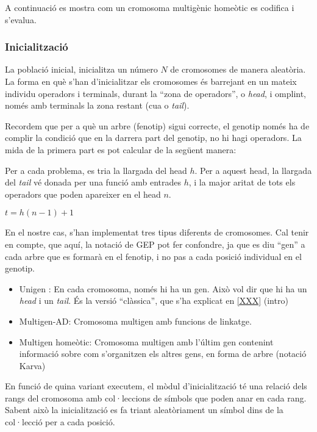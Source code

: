\documentclass[titlepage,a4paper,12pt]{book}
\begin{document}
A continuació es mostra com un cromosoma multigènic homeòtic es codifica i
s'evalua.


\subsubsection{Inicialització} %
\label{ssub:Inicialitzacio}
La població inicial, inicialitza un número $N$ de cromosomes de manera
aleatòria.  La forma en què s'han d'inicialitzar els cromosomes és barrejant en
un mateix individu operadors i terminals, durant la ``zona de operadors'', o
\emph{head}, i omplint, només amb terminals la zona restant (cua o \emph{tail}).

Recordem que per a què un arbre (fenotip) sigui correcte, el genotip només ha de
complir la condició que en la darrera part del genotip, no hi hagi operadors.
La mida de la primera part es pot calcular de la següent manera:

Per a cada problema, es tria la llargada del head $h$.  Per a aquest head, la
llargada del \emph{tail} vé donada per una funció amb entrades $h$, i la major
aritat de tots els operadors que poden apareixer en el head $n$.

\begin{math}
t =  h (n-1) + 1
\end{math}

En el nostre cas, s'han implementat tres tipus diferents de cromosomes. Cal
tenir en compte, que aquí, la notació de GEP pot fer confondre, ja que es diu
``gen'' a cada arbre que es formarà en el fenotip, i no pas a cada posició
individual en el genotip.

\begin{itemize}
	\item Unigen : En cada cromosoma, només hi ha un gen.  Això vol dir que hi
	ha un \emph{head} i un \emph{tail}. És la versió ``clàssica'', que s'ha
	explicat en \ref{XXX} (intro)
	\item Multigen-AD: Cromosoma multigen amb funcions de linkatge.
	\item Multigen homeòtic: Cromosoma multigen amb l'últim gen contenint
	informació sobre com s'organitzen els altres gens, en forma de arbre
	(notació Karva)
\end{itemize}

En funció de quina variant executem, el mòdul  d'inicialització té una relació
dels rangs del cromosoma amb col·leccions de símbols que poden anar en cada
rang.  Sabent això la inicialització es fa triant aleatòriament un símbol dins
de la col·lecció per a cada posició.
\end{document}
